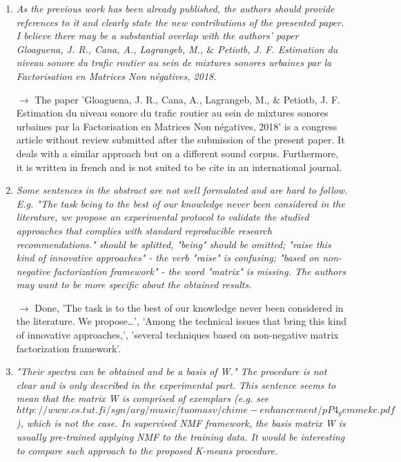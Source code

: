 \documentclass[10pt]{article}
\begin{document}
\begin{enumerate}
\item \emph{As the previous work has been already published, the authors should provide references to it and clearly state the new contributions of the presented paper. I believe there may be a substantial overlap with the authors' paper Gloaguena, J. R., Cana, A., Lagrangeb, M., $\&$ Petiotb, J. F. Estimation du niveau sonore du trafic routier au sein de mixtures sonores urbaines par la Factorisation en Matrices Non négatives, 2018.}

$\rightarrow$ The paper 'Gloaguena, J. R., Cana, A., Lagrangeb, M., $\&$ Petiotb, J. F. Estimation du niveau sonore du trafic routier au sein de mixtures sonores urbaines par la Factorisation en Matrices Non négatives, 2018' is a congress article without review submitted after the submission of the present paper. It deals with a similar approach but on a different sound corpus.  Furthermore, it is written in french and is not suited to be cite in an international journal. 


\item \emph{Some sentences in the abstract are not well formulated and are hard to follow. E.g. "The task being to the best of our knowledge never been considered in the literature, we propose an experimental protocol to validate the studied approaches that complies with standard reproducible research recommendations." should be splitted, "being" should be omitted; "raise this kind of innovative approaches" - the verb "raise" is confusing; "based on non-negative factorization framework" - the word "matrix" is missing. The authors may want to be more specific about the obtained results.}

$\rightarrow$ Done, 'The task is to the best of our knowledge never been considered in the literature. We propose…', 'Among the technical issues that bring this kind of innovative approaches,', 'several techniques based on non-negative matrix  factorization framework'.

\item \emph{"Their spectra can be obtained and be a basis of W." The procedure is not clear and is only described in the experimental part. This sentence seems to mean that the matrix W is comprised of exemplars (e.g. see $http://www.cs.tut.fi/sgn/arg/music/tuomasv/chime-enhancement/pP4_gemmeke.pdf$), which is not the case. In supervised NMF framework, the basis matrix W is usually pre-trained applying NMF to the training data. It would be interesting to compare such approach to the proposed K-means procedure.}


\end{enumerate}
\end{document}
